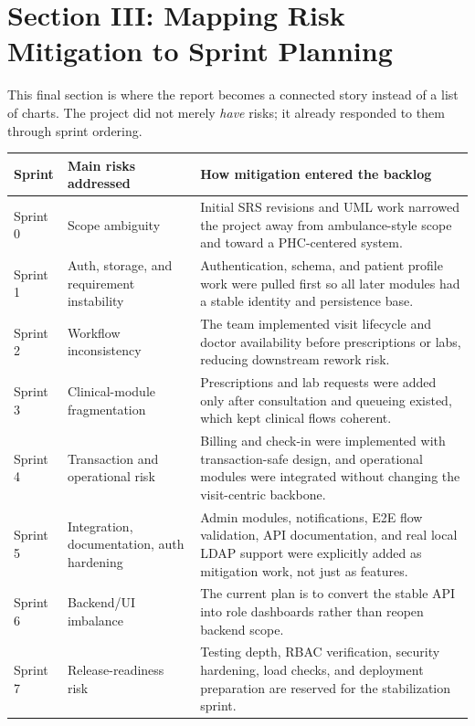 \documentclass[11pt,a4paper]{article}
\begin{document}
\section{Section III: Mapping Risk Mitigation to Sprint Planning}
This final section is where the report becomes a connected story instead of a list of charts. The project did not merely \emph{have} risks; it already responded to them through sprint ordering.

\begin{center}
\begin{tabular}{|p{1.3cm}|p{4cm}|p{7.7cm}|}
\hline
\rowcolor{SoftBlue}
\textbf{Sprint} & \textbf{Main risks addressed} & \textbf{How mitigation entered the backlog} \\
\hline
Sprint 0 & Scope ambiguity & Initial SRS revisions and UML work narrowed the project away from ambulance-style scope and toward a PHC-centered system. \\
\hline
Sprint 1 & Auth, storage, and requirement instability & Authentication, schema, and patient profile work were pulled first so all later modules had a stable identity and persistence base. \\
\hline
Sprint 2 & Workflow inconsistency & The team implemented visit lifecycle and doctor availability before prescriptions or labs, reducing downstream rework risk. \\
\hline
Sprint 3 & Clinical-module fragmentation & Prescriptions and lab requests were added only after consultation and queueing existed, which kept clinical flows coherent. \\
\hline
Sprint 4 & Transaction and operational risk & Billing and check-in were implemented with transaction-safe design, and operational modules were integrated without changing the visit-centric backbone. \\
\hline
Sprint 5 & Integration, documentation, auth hardening & Admin modules, notifications, E2E flow validation, API documentation, and real local LDAP support were explicitly added as mitigation work, not just as features. \\
\hline
Sprint 6 & Backend/UI imbalance & The current plan is to convert the stable API into role dashboards rather than reopen backend scope. \\
\hline
Sprint 7 & Release-readiness risk & Testing depth, RBAC verification, security hardening, load checks, and deployment preparation are reserved for the stabilization sprint. \\
\hline
\end{tabular}
\end{center}
\end{document}
